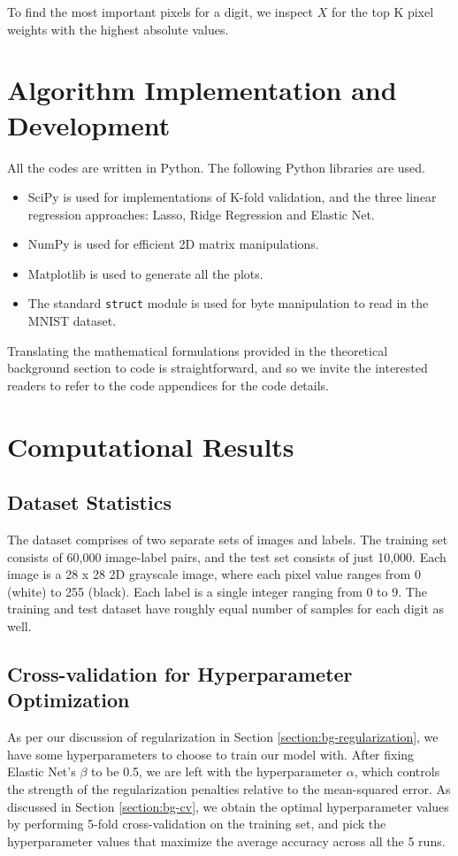 \documentclass[letterpaper, 10 pt, conference]{ieeeconf}  %
\begin{document}
To find the most important pixels for a digit, we inspect $X$ for the top K pixel weights with the highest absolute values.

\section{Algorithm Implementation and Development}
All the codes are written in Python. The following Python libraries are used.
\begin{itemize}
    \item SciPy is used for implementations of K-fold validation, and the three linear regression approaches: Lasso, Ridge Regression and Elastic Net.
    \item NumPy is used for efficient 2D matrix manipulations.
    \item Matplotlib is used to generate all the plots.
    \item The standard \texttt{struct} module is used for byte manipulation to read in the MNIST dataset.
\end{itemize}

Translating the mathematical formulations provided in the theoretical background section to code is straightforward, and so we invite the interested readers to refer to the code appendices for the code details.

\section{Computational Results}
\subsection{Dataset Statistics}
The dataset comprises of two separate sets of images and labels.
The training set consists of 60,000 image-label pairs, and the test set consists of just 10,000.
Each image is a 28 x 28 2D grayscale image, where each pixel value ranges from 0 (white) to 255 (black).
Each label is a single integer ranging from 0 to 9.
The training and test dataset have roughly equal number of samples for each digit as well.

\subsection{Cross-validation for Hyperparameter Optimization}
As per our discussion of regularization in Section \ref{section:bg-regularization}, we have some hyperparameters to choose to train our model with. After fixing Elastic Net's $\beta$ to be 0.5, we are left with the hyperparameter $\alpha$, which controls the strength of the regularization penalties relative to the mean-squared error. As discussed in Section \ref{section:bg-cv}, we obtain the optimal hyperparameter values by performing 5-fold cross-validation on the training set, and  pick the hyperparameter values that maximize the average accuracy across all the 5 runs.
\end{document}
